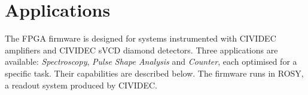 \documentclass[12pt]{packages/mytustyle}  %
\begin{document}


\section{Applications}
\label{sec:applications}

The FPGA firmware is designed for systems instrumented with CIVIDEC amplifiers and CIVIDEC sVCD diamond detectors. Three applications are available: \emph{Spectroscopy}, \emph{Pulse Shape Analysis} and \emph{Counter}, each optimised for a specific task. Their capabilities are described below. The firmware runs in ROSY, a readout system produced by CIVIDEC.
\end{document}

